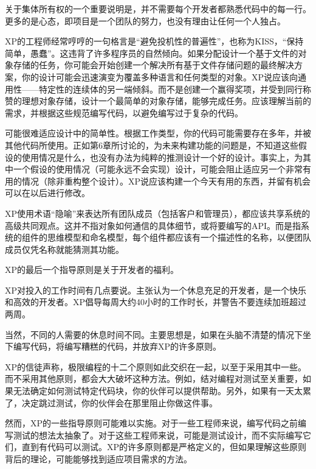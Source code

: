关于集体所有权的一个重要说明是，并不需要每个开发者都熟悉代码中的每一行。更多的是心态，即项目是一个团队的努力，也没有理由让任何一个人独占。


XP的工程师经常哼哼的一句格言是“避免投机性的普遍性”，也称为KISS，“保持简单，愚蠢”。这违背了许多程序员的自然倾向。如果分配设计一个基于文件的对象存储的任务，你可能会开始创建一个解决所有基于文件存储问题的最终解决方案，你的设计可能会迅速演变为覆盖多种语言和任何类型的对象。XP说应该向通用性——特定性的连续体的另一端倾斜。而不是创建一个赢得奖项，并受到同行称赞的理想对象存储，设计一个最简单的对象存储，能够完成任务。应该理解当前的需求，并根据这些规范编写代码，以避免编写过于复杂的代码。

可能很难适应设计中的简单性。根据工作类型，你的代码可能需要存在多年，并被其他代码所使用。正如第6章所讨论的，为未来构建功能的问题是，不知道这些假设的使用情况是什么，也没有办法为纯粹的推测设计一个好的设计。事实上，为其中一个假设的使用情况（可能永远不会实现）设计，可能会阻止适应另一个非常有用的情况（除非重构整个设计）。XP说应该构建一个今天有用的东西，并留有机会可以在以后进行修改。


XP使用术语“隐喻”来表达所有团队成员（包括客户和管理员），都应该共享系统的高级共同观点。这并不指对象如何通信的具体细节，或将要编写的API。而是指系统的组件的思维模型和命名模型，每个组件都应该有一个描述性的名称，以便团队成员仅凭名称就能猜测其功能。


XP的最后一个指导原则是关于开发者的福利。


XP对投入的工作时间有几点要说。主张认为一个休息充足的开发者，是一个快乐和高效的开发者。XP倡导每周大约40小时的工作时长，并警告不要连续加班超过两周。

当然，不同的人需要的休息时间不同。主要思想是，如果在头脑不清楚的情况下坐下编写代码，将编写糟糕的代码，并放弃XP的许多原则。


XP的信徒声称，极限编程的十二个原则如此交织在一起，以至于采用其中一些。而不采用其他原则，都会大大破坏这种方法。例如，结对编程对测试至关重要，如果无法确定如何测试特定代码块，你的伙伴可以提供帮助。另外，如果有一天太累了，决定跳过测试，你的伙伴会在那里阻止你做这件事。

然而，XP的一些指导原则可能难以实施。对于一些工程师来说，编写代码之前编写测试的想法太抽象了。对于这些工程师来说，可能是测试设计，而不实际编写它们，直到有代码可以测试。XP的许多原则都是严格定义的，但如果理解这些原则背后的理论，可能能够找到适应项目需求的方法。

